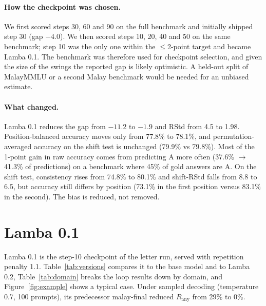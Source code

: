 \documentclass[11pt]{article}
\newcommand{\Rany}{R_{\text{any}}}
\begin{document}
\paragraph{How the checkpoint was chosen.} We first scored steps 30, 60 and 90 on the full benchmark and initially shipped step 30 (gap $-4.0$). We then scored steps 10, 20, 40 and 50 on the same benchmark; step 10 was the only one within the $\leq$2-point target and became Lamba 0.1. The benchmark was therefore used for checkpoint selection, and given the size of the swings the reported gap is likely optimistic. A held-out split of MalayMMLU or a second Malay benchmark would be needed for an unbiased estimate.

\paragraph{What changed.} Lamba 0.1 reduces the gap from $-11.2$ to $-1.9$ and RStd from 4.5 to 1.98. Position-balanced accuracy moves only from 77.8\% to 78.1\%, and permutation-averaged accuracy on the shift test is unchanged (79.9\% vs 79.8\%). Most of the 1-point gain in raw accuracy comes from predicting A more often (37.6\% $\rightarrow$ 41.3\% of predictions) on a benchmark where 45\% of gold answers are A. On the shift test, consistency rises from 74.8\% to 80.1\% and shift-RStd falls from 8.8 to 6.5, but accuracy still differs by position (73.1\% in the first position versus 83.1\% in the second). The bias is reduced, not removed.

\section{Lamba 0.1}

Lamba 0.1 is the step-10 checkpoint of the letter run, served with repetition penalty 1.1. Table~\ref{tab:versions} compares it to the base model and to Lamba 0.2, Table~\ref{tab:domain} breaks the loop results down by domain, and Figure~\ref{fig:example} shows a typical case. Under sampled decoding (temperature 0.7, 100 prompts), its predecessor malay-final reduced $\Rany$ from 29\% to 0\%.
\end{document}
